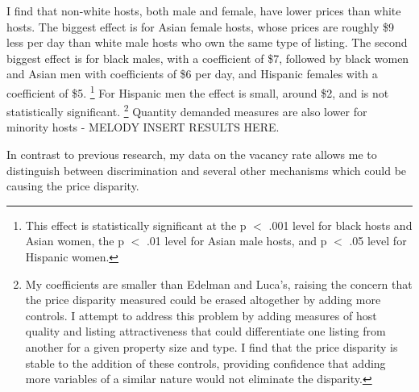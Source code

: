 I find that non-white hosts, both male and female, have lower prices than white hosts. The biggest effect is for Asian female hosts, whose prices are roughly \$9 less per day than white male hosts who own the same type of listing. The second biggest effect is for black males, with a coefficient of \$7, followed by black women and Asian men with coefficients of \$6 per day, and Hispanic females with a coefficient of \$5.%
	\footnote{This effect is statistically significant at the p $<$ .001 level for black hosts and Asian women, the p $<$ .01 level for Asian male hosts, and p $<$ .05 level for Hispanic women.} 
For Hispanic men the effect is small, around \$2, and is not statistically significant.%
	\footnote{My coefficients are smaller than Edelman and Luca's, raising the concern that the price disparity measured could be erased altogether by adding more controls. I attempt to address this problem by adding measures of host quality and listing attractiveness that could differentiate one listing from another for a given property size and type. I find that the price disparity is stable to the addition of these controls, providing confidence that adding more variables of a similar nature would not eliminate the disparity.}
Quantity demanded measures are also lower for minority hosts - MELODY INSERT RESULTS HERE. 

In contrast to previous research, my data on the vacancy rate allows me to distinguish between discrimination and several other mechanisms which could be causing the price disparity. 

